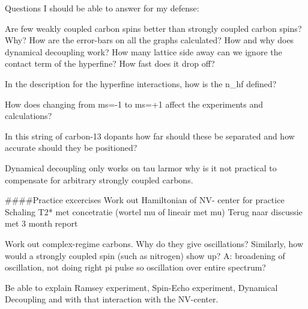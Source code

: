 Questions I should be able to answer for my defense:

Are few weakly coupled carbon spins better than strongly coupled carbon spins? Why?
How are the error-bars on all the graphs calculated?
How and why does dynamical decoupling work?
How many lattice side away can we ignore the contact term of the hyperfine? How fast does it drop off?

In the description for the hyperfine interactions, how is the n_hf defined?

How does changing from ms=-1 to ms=+1 affect the experiments and calculations?

In this string of carbon-13  dopants how far should these be separated and how accurate should they be positioned?

Dynamical decoupling only works on tau larmor
why is it not practical to compensate for arbitrary strongly coupled carbons.



####Practice excercises
Work out Hamiltonian of NV- center for practice
Schaling T2* met concetratie (wortel mu of lineair met mu) Terug naar discussie met 3 month report

Work out complex-regime carbons. Why do they give oscillations?
Similarly, how would a strongly coupled spin (such as nitrogen) show up? A: broadening of oscillation, not doing right pi pulse so oscillation over entire spectrum?

Be able to explain Ramsey experiment, Spin-Echo experiment, Dynamical Decoupling and with that interaction with the NV-center.

